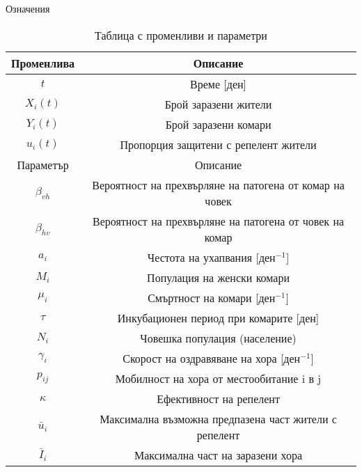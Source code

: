 \begin{frame}[t]{Означения}
  \vspace{-1em}
  \begin{table}
    \begin{small}
      \begin{table}[h]
        \centering
        \begin{tabular}{ |c||c| }
          \hline
          Променлива & Описание\\
          \hline
          $t$ & Време [$\text{ден}$]\\
          $X_i(t)$ & Брой заразени жители\\
          $Y_i(t)$ & Брой заразени комари \\
          $u_i(t)$ & Пропорция защитени с репелент жители \\
          \hline
          \hline
          Параметър & Описание\\
          \hline
          $\beta_{vh}$ & Вероятност на прехвърляне на патогена от комар на човек \\
          $\beta_{hv}$ & Вероятност на прехвърляне на патогена от човек на комар \\
          $a_i$ & Честота на ухапвания [$\text{ден}^{-1}$]\\
          $M_i$ & Популация на женски комари\\
          $\mu_i$ & Смъртност на комари [$\text{ден}^{-1}$]\\
          $\tau$ & Инкубационен период при комарите [$\text{ден}$]\\
          $N_i$ & Човешка популация (население) \\
          $\gamma_i$ & Скорост на оздравяване на хора [$\text{ден}^{-1}$]\\
          $p_{ij}$ & Мобилност на хора от местообитание i в j\\
          $\kappa$ & Ефективност на репелент\\
          $\bar{u}_i$ & Максимална възможна предпазена част жители с репелент\\
          $\bar{I}_i$ & Максимална част на заразени хора\\
          \hline
        \end{tabular}
      \end{table}
    \end{small}
    \caption{Таблица с променливи и параметри}
    \label{tbl:Definitions}
  \end{table}
\end{frame}

